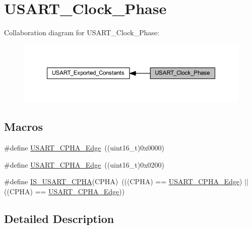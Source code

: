 \hypertarget{group___u_s_a_r_t___clock___phase}{}\section{U\+S\+A\+R\+T\+\_\+\+Clock\+\_\+\+Phase}
\label{group___u_s_a_r_t___clock___phase}
Collaboration diagram for U\+S\+A\+R\+T\+\_\+\+Clock\+\_\+\+Phase\+:
\nopagebreak
\begin{figure}[H]
\begin{center}
\leavevmode
\includegraphics[width=350pt]{group___u_s_a_r_t___clock___phase}
\end{center}
\end{figure}
\subsection*{Macros}
\begin{DoxyCompactItemize}
\item 
\#define \hyperlink{group___u_s_a_r_t___clock___phase_gab6c0fb052fb9bc418cf368c1a0e4643b}{U\+S\+A\+R\+T\+\_\+\+C\+P\+H\+A\+\_\+Edge}~((uint16\+\_\+t)0x0000)
\item 
\#define \hyperlink{group___u_s_a_r_t___clock___phase_ga66344d0725f1300e9d0f8f1708111f25}{U\+S\+A\+R\+T\+\_\+\+C\+P\+H\+A\+\_\+Edge}~((uint16\+\_\+t)0x0200)
\item 
\#define \hyperlink{group___u_s_a_r_t___clock___phase_ga66fa1a3a757025fcd8dd069a90689f88}{I\+S\+\_\+\+U\+S\+A\+R\+T\+\_\+\+C\+P\+HA}(C\+P\+HA)~(((C\+P\+HA) == \hyperlink{group___u_s_a_r_t___clock___phase_gab6c0fb052fb9bc418cf368c1a0e4643b}{U\+S\+A\+R\+T\+\_\+\+C\+P\+H\+A\+\_\+Edge}) $\vert$$\vert$ ((C\+P\+HA) == \hyperlink{group___u_s_a_r_t___clock___phase_ga66344d0725f1300e9d0f8f1708111f25}{U\+S\+A\+R\+T\+\_\+\+C\+P\+H\+A\+\_\+Edge}))
\end{DoxyCompactItemize}


\subsection{Detailed Description}


